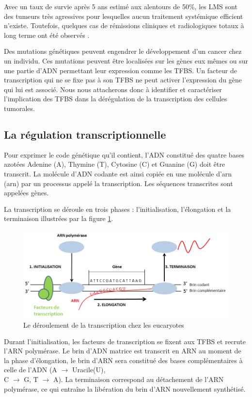 Avec un taux de survie après 5 ans estimé aux alentours de 50\%, les LMS sont des tumeurs très agressives pour lesquelles aucun traitement systémique efficient n'existe. Toutefois, quelques cas de rémissions cliniques et radiologiques totaux à long terme ont été observés \citep{Cure}.

Des mutations génétiques peuvent engendrer le développement d'un cancer chez un individu. Ces mutations peuvent être localisées sur les gènes eux mêmes ou sur une partie d'ADN permettant leur expression comme les TFBS. Un \gls{facteur de transcription} qui ne se fixe pas à son TFBS ne peut activer l'expression du gène qui lui est associé. Nous nous attacherons donc à identifier et caractériser l'implication des TFBS dans la dérégulation de la transcription des cellules tumorales.

\newpage
\subsection{La régulation transcriptionnelle}\label{subsec:transcription}

Pour exprimer le code génétique qu'il contient, l'ADN constitué des quatre bases azotées Adenine (A), Thymine (T), Cytosine (C) et Guanine (G) doit être transcrit. La molécule d'ADN codante est ainsi copiée en une molécule d'\acrlong{arn} (\acrshort{arn}) par un processus appelé la \gls{transcription}. Les séquences transcrites sont appelées gènes.

La transcription se déroule en trois phases : l'initialisation, l'élongation et la terminaison illustrées par la figure \ref{trans}.

\begin{figure}[h]
\centering
\includegraphics[scale=0.7]{Figures/transcription.png}
\caption{Le déroulement de la transcription chez les eucaryotes}
\label{trans}
\end{figure}

Durant l'initialisation, les facteurs de transcription se fixent aux TFBS et recrute l'ARN polymérase. Le brin d'ADN matrice est transcrit en ARN au moment de la phase d'élongation, le brin d'ARN sera constitué des bases complémentaires à celle de l'ADN (A $\rightarrow$ Uracile(U), \\C $\rightarrow$ G, T $\rightarrow$ A). La terminaison correspond au détachement de l'ARN polymérase, ce qui entraîne la libération du brin d'ARN nouvellement synthétisé.

